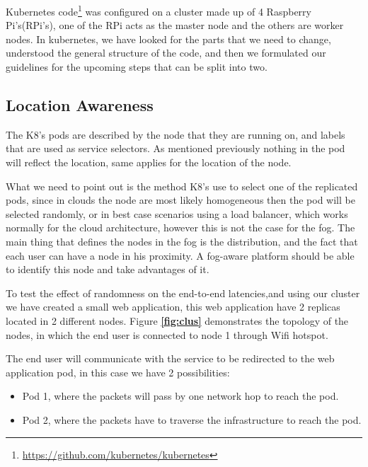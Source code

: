 \documentclass[letterpaper,twocolumn,10pt]{article}
\let\origref\ref
\def\ref#1{\textbf{\origref{#1}}}
\begin{document}
Kubernetes code\footnote{\url{https://github.com/kubernetes/kubernetes}} was configured on a cluster made up of 4 Raspberry Pi's(RPi's), one of the RPi acts as the master node and the others are worker nodes. In kubernetes, we have looked for the parts that we need to change, understood the general structure of the code, and then we formulated our guidelines for the upcoming steps that can be split into two. 
 
\subsection{Location Awareness}

The K8's pods are described by the node that they are running on, and labels that are used as service selectors. As mentioned previously nothing in the pod will reflect the location, same applies for the location of the node. 

What we need to point out is the method K8's use to select one of the replicated pods, since in clouds the node are most likely homogeneous then the pod will be selected randomly, or in best case scenarios using a load balancer, which works normally for the cloud architecture, however this is not the case for the fog. The main thing that defines the nodes in the fog is the distribution, and the fact that each user can have a node in his proximity. A fog-aware platform should be able to identify this node and take advantages of it. 

To test the effect of randomness on the end-to-end latencies,and using our cluster we have created a small web application, this web application have 2 replicas located in 2 different nodes. Figure \ref{fig:clus} demonstrates the topology of the nodes, in which the end user is connected to node 1 through Wifi hotspot.

The end user will communicate with the service to be redirected to the web application pod, in this case we have 2 possibilities: 
\begin{itemize}
\item Pod 1, where the packets will pass by one network hop to reach the pod. 
\item Pod 2, where the packets have to traverse the infrastructure to reach the pod.
\end{itemize}
 
\end{document}
